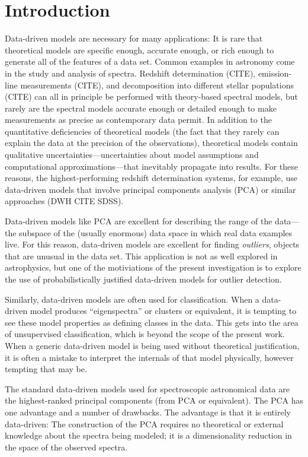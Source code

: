 \documentclass[12pt,preprint]{aastex}
\begin{document}
\section{Introduction}\label{sec:introduction}
Data-driven models are necessary for many applications: It is rare
that theoretical models are specific enough, accurate enough, or rich
enough to generate all of the features of a data set.  Common examples
in astronomy come in the study and analysis of spectra.  Redshift
determination (CITE), emission-line measurements (CITE), and
decomposition into different stellar populations (CITE) can all in
principle be performed with theory-based spectral models, but rarely
are the spectral models accurate enough or detailed enough to make
measurements as precise as contemporary data permit.  In addition to
the quantitative deficiencies of theoretical models (the fact that
they rarely can explain the data at the precision of the
observations), theoretical models contain qualitative
uncertainties---uncertainties about model assumptions and
computational approximations---that inevitably propagate into results.
For these reasons, the highest-performing redshift determination
systems, for example, use data-driven models that involve principal
components analysis (PCA) or similar approaches (DWH CITE SDSS).

Data-driven models like PCA are excellent for describing the range of
the data---the subspace of the (usually enormous) data space in which
real data examples live.  For this reason, data-driven models are
excellent for finding \emph{outliers}, objects that are unusual in the
data set.  This application is not as well explored in astrophysics,
but one of the motiviations of the present investigation is to explore
the use of probabilistically justified data-driven models for outlier
detection.

Similarly, data-driven models are often used for classification.  When
a data-driven model produces ``eigenspectra'' or clusters or
equivalent, it is tempting to see these model properties as defining
classes in the data.  This gets into the area of unsupervised
classification, which is beyond the scope of the present work.  When a
generic data-driven model is being used without theoretical
justification, it is often a mistake to interpret the internals of
that model physically, however tempting that may be.

The standard data-driven models used for spectroscopic astronomical
data are the highest-ranked principal components (from PCA or
equivalent). The PCA has one advantage and a number of drawbacks.  The
advantage is that it is entirely data-driven: The construction of the
PCA requires no theoretical or external knowledge about the spectra
being modeled; it is a dimensionality reduction in the space of the
observed spectra.
\end{document}
